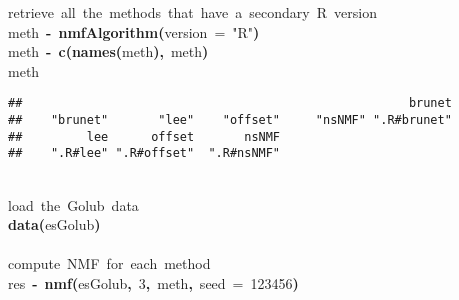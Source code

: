 \documentclass[a4paper]{article}\usepackage{graphicx, color}
\makeatletter
\newcommand{\hlnumber}[1]{\textcolor[rgb]{0,0,0}{#1}}%
\newcommand{\hlfunctioncall}[1]{\textcolor[rgb]{0.501960784313725,0,0.329411764705882}{\textbf{#1}}}%
\newcommand{\hlstring}[1]{\textcolor[rgb]{0.6,0.6,1}{#1}}%
\newcommand{\hlkeyword}[1]{\textcolor[rgb]{0,0,0}{\textbf{#1}}}%
\newcommand{\hlargument}[1]{\textcolor[rgb]{0.690196078431373,0.250980392156863,0.0196078431372549}{#1}}%
\newcommand{\hlcomment}[1]{\textcolor[rgb]{0.180392156862745,0.6,0.341176470588235}{#1}}%
\newcommand{\hlassignement}[1]{\textcolor[rgb]{0,0,0}{\textbf{#1}}}%
\newcommand{\hlsymbol}[1]{\textcolor[rgb]{0,0,0}{#1}}%
\newcommand{\hlstd}[1]{\textcolor[rgb]{0,0,0}{#1}}%
\newenvironment{kframe}{%
 \def\FrameCommand##1{\hskip\@totalleftmargin \hskip-\fboxsep
 \colorbox{shadecolor}{##1}\hskip-\fboxsep
     \hskip-\linewidth \hskip-\@totalleftmargin \hskip\columnwidth}%
 \MakeFramed {\advance\hsize-\width
   \@totalleftmargin\z@ \linewidth\hsize
   \@setminipage}}%
 {\par\unskip\endMakeFramed}
\newenvironment{knitrout}{}{} %
\makeatother
\begin{document}
\begin{knitrout}
\color{fgcolor}\begin{kframe}
\begin{flushleft}
\ttfamily\noindent
\hlcomment{\usebox{\hlnormalsizeboxhash}{\ }retrieve{\ }all{\ }the{\ }methods{\ }that{\ }have{\ }a{\ }secondary{\ }R{\ }version}\hspace*{\fill}\\
\hlstd{}\hlsymbol{meth}{\ }\hlassignement{\usebox{\hlnormalsizeboxlessthan}-}{\ }\hlfunctioncall{nmfAlgorithm}\hlkeyword{(}\hlargument{version}{\ }\hlargument{=}{\ }\hlstring{"{}R"{}}\hlkeyword{)}\hspace*{\fill}\\
\hlstd{}\hlsymbol{meth}{\ }\hlassignement{\usebox{\hlnormalsizeboxlessthan}-}{\ }\hlfunctioncall{c}\hlkeyword{(}\hlfunctioncall{names}\hlkeyword{(}\hlsymbol{meth}\hlkeyword{)}\hlkeyword{,}{\ }\hlsymbol{meth}\hlkeyword{)}\hspace*{\fill}\\
\hlstd{}\hlsymbol{meth}\mbox{}
\normalfont
\end{flushleft}
\begin{verbatim}
##                                                      brunet 
##    "brunet"       "lee"    "offset"     "nsNMF" ".R#brunet" 
##         lee      offset       nsNMF 
##    ".R#lee" ".R#offset"  ".R#nsNMF" 
\end{verbatim}
\begin{flushleft}
\ttfamily\noindent
\hspace*{\fill}\\
\hlstd{}\hlcomment{\usebox{\hlnormalsizeboxhash}{\ }load{\ }the{\ }Golub{\ }data}\hspace*{\fill}\\
\hlstd{}\hlfunctioncall{data}\hlkeyword{(}\hlsymbol{esGolub}\hlkeyword{)}\hspace*{\fill}\\
\hlstd{}\hspace*{\fill}\\
\hlstd{}\hlcomment{\usebox{\hlnormalsizeboxhash}{\ }compute{\ }NMF{\ }for{\ }each{\ }method}\hspace*{\fill}\\
\hlstd{}\hlsymbol{res}{\ }\hlassignement{\usebox{\hlnormalsizeboxlessthan}-}{\ }\hlfunctioncall{nmf}\hlkeyword{(}\hlsymbol{esGolub}\hlkeyword{,}{\ }\hlnumber{3}\hlkeyword{,}{\ }\hlsymbol{meth}\hlkeyword{,}{\ }\hlargument{seed}{\ }\hlargument{=}{\ }\hlnumber{123456}\hlkeyword{)}\mbox{}

\end{flushleft}
\end{kframe}
\end{knitrout}
\end{document}
